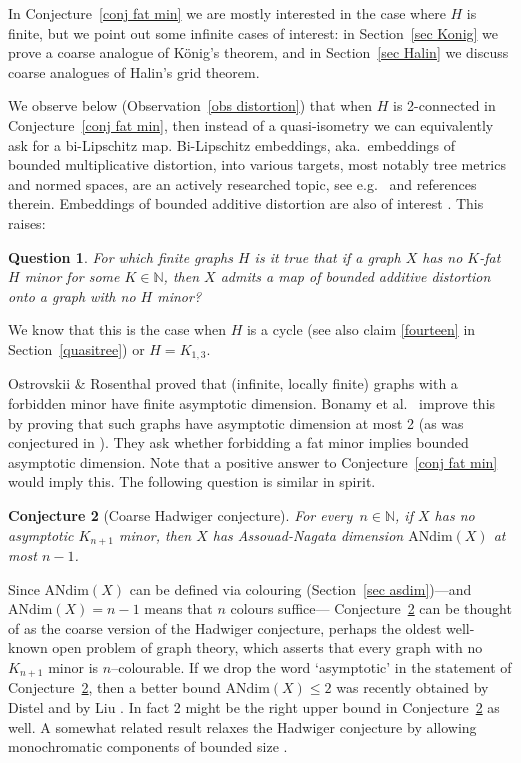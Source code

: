 \documentclass[a4paper]{article}
\newtheorem{conjecture}{{Conjecture}}[section]
\newtheorem{question}[conjecture]{{Question}}
\newcommand{\N}{\ensuremath{\mathbb N}}
\newcommand{\nin}{\ensuremath{{n\in\N}}}
\newcommand{\Sr}[1]{Section~\ref{#1}}
\newcommand{\Cnr}[1]{Con\-jecture~\ref{#1}}
\newcommand{\Or}[1]{Observation~\ref{#1}}
\newcommand{\Fe}{For every}
\newcommand{\andim}{\ensuremath{\mathrm{ANdim}}}
\begin{document}
In \Cnr{conj fat min} we are mostly interested in the case where $H$ is finite, but we point out some infinite cases of interest: in \Sr{sec Konig} we prove a coarse analogue of K\"onig's theorem, and in \Sr{sec Halin} we discuss coarse analogues of  Halin's grid theorem.
\medskip

We observe below (\Or{obs distortion}) that when $H$ is 2-connected in \Cnr{conj fat min}, then instead of a quasi-isometry we can equivalently ask for a bi-Lipschitz map. Bi-Lipschitz embeddings, aka.\ embeddings of bounded multiplicative distortion, into various targets, most notably tree metrics and normed spaces, are an actively researched topic, see e.g.\ \cite{CDNRV,eriksson-bique,NaorInt,Ostrovskii} and references therein. Embeddings of bounded additive distortion are also of interest \cite{CDNRV}. This raises:
\begin{question}
For which finite graphs $H$ is it true that if a graph $X$ has no $K$-fat $H$ minor for some $K\in \N$, then $X$ admits a map of bounded additive distortion onto a graph with no $H$ minor?
\end{question}
We know that this is the case when $H$ is a cycle \cite{KerTre} (see also claim \eqref{fourteen} in \Sr{quasitree}) or $H=K_{1,3}$. 

\medskip
Ostrovskii \& Rosenthal \cite{OstRosMet} proved that (infinite, locally finite) graphs with a forbidden minor have finite asymptotic dimension. Bonamy et al.\ \cite{BBEGLPS} improve this by proving that such graphs have asymptotic dimension at most 2 (as was conjectured in \cite{FujPapCoa}). They ask whether forbidding a fat minor implies bounded asymptotic dimension. Note that a positive answer to \Cnr{conj fat min} would imply this.  The following question is similar in spirit.

\begin{conjecture}[Coarse Hadwiger conjecture] \label{coa Had}
\Fe\ \nin, if $X$ has no asymptotic $K_{n+1}$ minor, then $X$ has Assouad-Nagata dimension $\andim(X)$ at most $n-1$.
\end{conjecture}

Since $\andim(X)$ can be defined via colouring (\Sr{sec asdim})---and $\andim(X)=n-1$ means that $n$ colours suffice--- \Cnr{coa Had}  can be thought of as the coarse version of the Hadwiger conjecture, perhaps the oldest well-known open problem of graph theory, which asserts that every graph with no $K_{n+1}$ minor is $n$--colourable. If we drop the word `asymptotic' in the  statement of \Cnr{coa Had}, then a better bound  $\andim(X)\leq 2$ was recently obtained by Distel \cite{DisPro} and by Liu \cite{LiuAss}.  In fact 2 might be the right upper bound in \Cnr{coa Had} as well.  A somewhat related result relaxes the Hadwiger conjecture by allowing monochromatic components of bounded size \cite{DEMW}.
\end{document}
